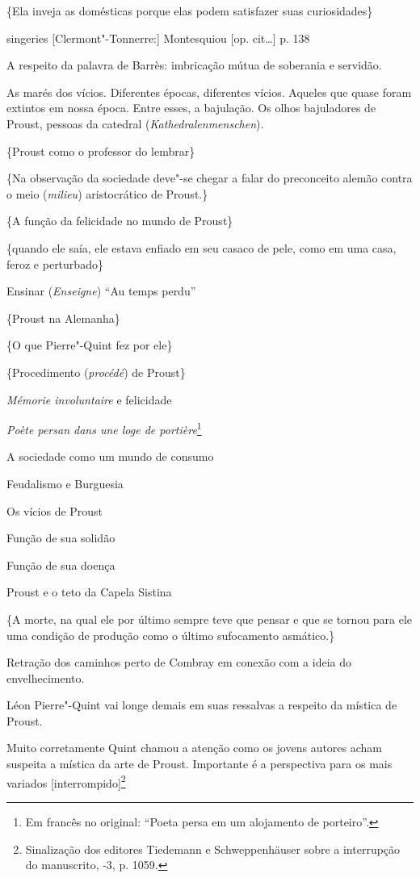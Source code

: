 \{Ela inveja as domésticas porque elas podem satisfazer suas
curiosidades\}

singeries {[}Clermont"-Tonnerre:{]} Montesquiou {[}op. cit\ldots{}{]} p. 138

A respeito da palavra de Barrès: imbricação mútua de soberania e
servidão.

As marés dos vícios. Diferentes épocas, diferentes vícios. Aqueles que
quase foram extintos em nossa época. Entre esses, a bajulação. Os olhos
bajuladores de Proust, pessoas da catedral (\emph{Kathedralenmenschen}).

\{Proust como o professor do lembrar\}

\{Na observação da sociedade deve"-se chegar a falar do preconceito
alemão contra o meio (\emph{milieu}) aristocrático de Proust.\}

\{A função da felicidade no mundo de Proust\}

\{quando ele saía, ele estava enfiado em seu casaco de pele, como em uma
casa, feroz e perturbado\}

Ensinar (\emph{Enseigne}) ``Au temps perdu''

\{Proust na Alemanha\}

\{O que Pierre"-Quint fez por ele\}

\{Procedimento (\emph{procédé}) de Proust\}

\emph{Mémorie involuntaire} e felicidade

\emph{Poète persan dans une loge de portière}\footnote{Em francês no original: ``Poeta
  persa em um alojamento de porteiro''. \versal{[N. T.]}}

A sociedade como um mundo de consumo

Feudalismo e Burguesia

Os vícios de Proust

Função de sua solidão

Função de sua doença

Proust e o teto da Capela Sistina

\{A morte, na qual ele por último sempre teve que pensar e que se tornou
para ele uma condição de produção como o último sufocamento asmático.\}

Retração dos caminhos perto de Combray em conexão com a ideia do
envelhecimento.

Léon Pierre"-Quint vai longe demais em suas ressalvas a respeito da
mística de Proust.

Muito corretamente Quint chamou a atenção como os jovens autores acham
suspeita a mística da arte de Proust. Importante é a perspectiva para os
mais variados {[}interrompido{]}\footnote{Sinalização dos editores
  Tiedemann e Schweppenhäuser sobre a interrupção do manuscrito,
  -3, p. 1059. \versal{[N. T.]}}

